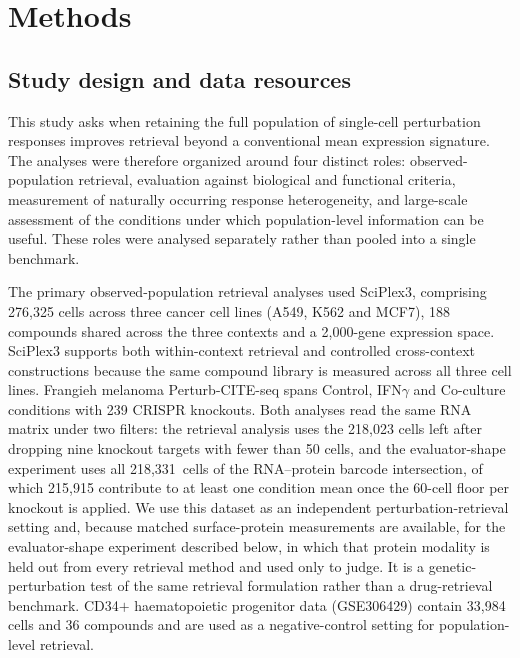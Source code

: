 \documentclass[11pt,letterpaper]{article}
\newcommand{\SHAPECELLS}{218{,}331}
\begin{document}
\section*{Methods}

\subsection*{Study design and data resources}

This study asks when retaining the full population of single-cell perturbation responses improves retrieval beyond a conventional mean expression signature. The analyses were therefore organized around four distinct roles: observed-population retrieval, evaluation against biological and functional criteria, measurement of naturally occurring response heterogeneity, and large-scale assessment of the conditions under which population-level information can be useful. These roles were analysed separately rather than pooled into a single benchmark.

The primary observed-population retrieval analyses used SciPlex3\cite{dataSciPlex3}, comprising 276,325 cells across three cancer cell lines (A549, K562 and MCF7), 188 compounds shared across the three contexts and a 2,000-gene expression space. SciPlex3 supports both within-context retrieval and controlled cross-context constructions because the same compound library is measured across all three cell lines. Frangieh melanoma Perturb-CITE-seq\cite{dataFrangieh} spans Control, IFN$\gamma$ and Co-culture conditions with 239 CRISPR knockouts. Both analyses read the same RNA matrix under two filters: the retrieval analysis uses the 218,023 cells left after dropping nine knockout targets with fewer than 50 cells, and the evaluator-shape experiment uses all \SHAPECELLS\ cells of the RNA--protein barcode intersection, of which 215,915 contribute to at least one condition mean once the 60-cell floor per knockout is applied. We use this dataset as an independent perturbation-retrieval setting and, because matched surface-protein measurements are available, for the evaluator-shape experiment described below, in which that protein modality is held out from every retrieval method and used only to judge. It is a genetic-perturbation test of the same retrieval formulation rather than a drug-retrieval benchmark. CD34$+$ haematopoietic progenitor data (GSE306429)\cite{dataCD34} contain 33,984 cells and 36 compounds and are used as a negative-control setting for population-level retrieval.
\end{document}

